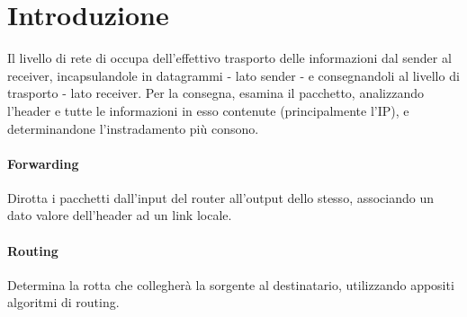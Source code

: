 \section{Introduzione}
Il livello di rete di occupa dell'effettivo trasporto delle informazioni dal sender al receiver, incapsulandole in datagrammi - lato sender - e consegnandoli al livello di trasporto - lato receiver.
Per la consegna, esamina il pacchetto, analizzando l'header e tutte le informazioni in esso contenute (principalmente l'IP), e determinandone l'instradamento più consono.

\paragraph{Forwarding}
Dirotta i pacchetti dall'input del router all'output dello stesso, associando un dato valore dell'header ad un link locale. \hfill \\
\paragraph{Routing}
Determina la rotta che collegherà la sorgente al destinatario, utilizzando appositi algoritmi di routing. \hfill \\

